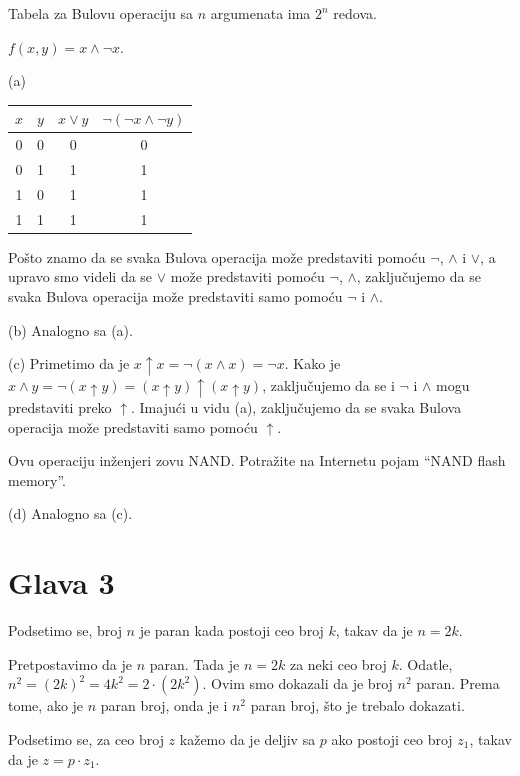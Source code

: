 Tabela za Bulovu operaciju sa $n$ argumenata ima $2^n$ redova.

$f(x, y) = x \land \lnot x$.


(a) 
\begin{tabular}[t]{c|c|c|c}
  $x$ & $y$ & $x \lor y$ & $\lnot(\lnot x \land \lnot y)$ \\
  \hline\hline
  0 & 0 & 0 & 0\\
  0 & 1 & 1 & 1\\
  1 & 0 & 1 & 1\\
  1 & 1 & 1 & 1
\end{tabular}

\medskip

Po\v sto znamo da se svaka Bulova operacija mo\v ze predstaviti pomo\'cu $\lnot$, $\land$ i $\lor$,
a upravo smo videli da se $\lor$ mo\v ze predstaviti pomo\'cu $\lnot$, $\land$, zaklju\v cujemo da se 
svaka Bulova operacija mo\v ze predstaviti samo pomo\'cu $\lnot$ i $\land$.

\medskip

(b) Analogno sa (a).

\medskip

(c) Primetimo da je $x \uparrow x = \lnot(x \land x) = \lnot x$.
Kako je $x \land y = \lnot(x \uparrow y) = (x \uparrow y) \uparrow (x \uparrow y)$, zaklju\v cujemo
da se i $\lnot$ i $\land$ mogu predstaviti preko $\uparrow$. Imaju\'ci u vidu (a), zaklju\v cujemo
da se svaka Bulova operacija mo\v ze predstaviti samo pomo\'cu $\uparrow$.

Ovu operaciju in\v zenjeri zovu NAND. Potra\v zite na Internetu pojam \enquote{NAND flash memory}.

\medskip

(d) Analogno sa (c).

\section{Glava 3}

Podsetimo se, broj $n$ je paran kada postoji ceo broj $k$, takav da je $n=2k$.

Pretpostavimo da je $n$ paran. Tada je $n=2k$ za neki ceo broj $k$. Odatle, $n^2=(2k)^2=4k^2=2\cdot(2k^2)$. Ovim smo dokazali da je broj $n^2$ paran. Prema tome, ako je $n$ paran broj, onda je i $n^2$ paran broj, \v sto je trebalo dokazati.

 Podsetimo se, za ceo broj $z$ ka\v zemo da je deljiv sa $p$ ako postoji ceo broj $z_1$, takav da je $z=p\cdot z_1$.

